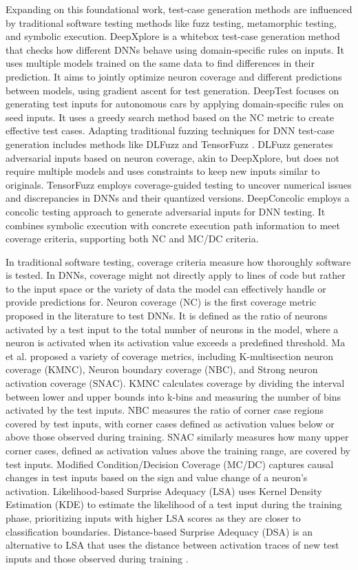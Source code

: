  Expanding on this foundational work, test-case generation methods are influenced by traditional software testing methods like fuzz testing, metamorphic testing, and symbolic execution. DeepXplore \cite{deepxplore} is a whitebox test-case generation method that checks how different DNNs behave using domain-specific rules on inputs. It uses multiple models trained on the same data to find differences in their prediction. It aims to jointly optimize neuron coverage and different predictions between models, using gradient ascent for test generation. DeepTest \cite{deeptest} focuses on generating test inputs for autonomous cars by applying domain-specific rules on seed inputs. It uses a greedy search method based on the NC metric to create effective test cases. Adapting traditional fuzzing techniques for DNN test-case generation includes methods like DLFuzz \cite{DLFuzz} and TensorFuzz \cite{tensorfuzz}. DLFuzz generates adversarial inputs based on neuron coverage, akin to DeepXplore, but does not require multiple models and uses constraints to keep new inputs similar to originals. TensorFuzz employs coverage-guided testing to uncover numerical issues and discrepancies in DNNs and their quantized versions. DeepConcolic \cite{Deepconcolic} employs a concolic testing approach to generate adversarial inputs for DNN testing. It combines symbolic execution with concrete execution path information to meet coverage criteria, supporting both NC and MC/DC criteria.

In traditional software testing, coverage criteria measure how thoroughly software is tested. In DNNs, coverage might not directly apply to lines of code but rather to the input space or the variety of data the model can effectively handle or provide predictions for. Neuron coverage (NC) \cite{deepxplore} is the first coverage metric proposed in the literature to test DNNs. It is defined as the ratio of neurons activated by a test input to the total number of neurons in the model, where a neuron is activated when its activation value exceeds a predefined threshold. Ma et al. \cite{Ma} proposed a variety of coverage metrics, including K-multisection neuron coverage (KMNC), Neuron boundary coverage (NBC), and Strong neuron activation coverage (SNAC). KMNC calculates coverage by dividing the interval between lower and upper bounds into k-bins and measuring the number of bins activated by the test inputs. NBC measures the ratio of corner case regions covered by test inputs, with corner cases defined as activation values below or above those observed during training. SNAC similarly measures how many upper corner cases, defined as activation values above the training range, are covered by test inputs. Modified Condition/Decision Coverage (MC/DC) \cite{SunY} captures causal changes in test inputs based on the sign and value change of a neuron's activation. Likelihood-based Surprise Adequacy (LSA) uses Kernel Density Estimation (KDE) to estimate the likelihood of a test input during the training phase, prioritizing inputs with higher LSA scores as they are closer to classification boundaries. Distance-based Surprise Adequacy (DSA) is an alternative to LSA that uses the distance between activation traces of new test inputs and those observed during training \cite{Kim}.

